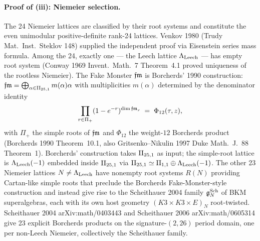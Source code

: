 \paragraph{Proof of \textup{(iii)}: Niemeier selection.}
The 24 Niemeier lattices are classified by their root systems and
constitute the even unimodular positive-definite rank-24 lattices.
Venkov 1980 (Trudy Mat.\ Inst.\ Steklov 148) supplied the independent
proof via Eisenstein series mass formula. Among the 24, exactly one
--- the Leech lattice $\Lambda_{\mathrm{Leech}}$ --- has empty root system
(Conway 1969 Invent.\ Math.\ 7 Theorem~4.1 proved uniqueness of the
rootless Niemeier). The Fake Monster $\mathfrak{fm}$ is Borcherds' 1990
construction:
$\mathfrak{fm} = \bigoplus_{\alpha \in \mathrm{II}_{25,1}} m(\alpha) \alpha$ with
multiplicities $m(\alpha)$ determined by the denominator identity
\[
  \prod_{r \in \Pi_+} (1 - e^{-r})^{\dim \mathfrak{fm}_r}
  \;=\;
  \Phi_{12}(\tau, z),
\]
with $\Pi_+$ the simple roots of $\mathfrak{fm}$ and $\Phi_{12}$ the weight-$12$
Borcherds product (Borcherds 1990 Theorem~10.1,
also Gritsenko--Nikulin 1997 Duke Math.\ J.\ 88 Theorem~1).
Borcherds' construction takes $\mathrm{II}_{25,1}$ as input; the simple-root
lattice is $\Lambda_{\mathrm{Leech}}(-1)$ embedded inside $\mathrm{II}_{25,1}$ via
$\mathrm{II}_{25,1} \simeq \mathrm{II}_{1,1} \oplus \Lambda_{\mathrm{Leech}}(-1)$. The other 23
Niemeier lattices $N \neq \Lambda_{\mathrm{Leech}}$ have nonempty root systems
$R(N)$ providing Cartan-like simple roots that preclude the
Borcherds Fake-Monster-style construction and instead give rise to
the Scheithauer 2004 family $\mathfrak{g}^{\mathrm{Sch}}_N$ of BKM superalgebras, each
with its own host geometry $(K3 \times K3 \times E)_N$
root-twisted. Scheithauer 2004 arXiv:math/0403443 and Scheithauer
2006 arXiv:math/0605314 give 23 explicit Borcherds products on the
signature-$(2, 26)$ period domain, one per non-Leech Niemeier,
collectively the Scheithauer family.

